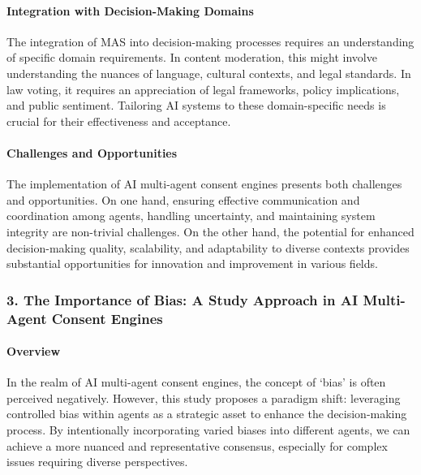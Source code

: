 \hypertarget{integration-with-decision-making-domains}{%
\paragraph{Integration with Decision-Making
Domains}\label{integration-with-decision-making-domains}}

The integration of MAS into decision-making processes requires an
understanding of specific domain requirements. In content moderation,
this might involve understanding the nuances of language, cultural
contexts, and legal standards. In law voting, it requires an
appreciation of legal frameworks, policy implications, and public
sentiment. Tailoring AI systems to these domain-specific needs is
crucial for their effectiveness and acceptance.

\hypertarget{challenges-and-opportunities}{%
\paragraph{Challenges and
Opportunities}\label{challenges-and-opportunities}}

The implementation of AI multi-agent consent engines presents both
challenges and opportunities. On one hand, ensuring effective
communication and coordination among agents, handling uncertainty, and
maintaining system integrity are non-trivial challenges. On the other
hand, the potential for enhanced decision-making quality, scalability,
and adaptability to diverse contexts provides substantial opportunities
for innovation and improvement in various fields.

\hypertarget{the-importance-of-bias-a-study-approach-in-ai-multi-agent-consent-engines}{%
\subsubsection{3. The Importance of Bias: A Study Approach in AI
Multi-Agent Consent
Engines}\label{the-importance-of-bias-a-study-approach-in-ai-multi-agent-consent-engines}}

\hypertarget{overview}{%
\paragraph{Overview}\label{overview}}

In the realm of AI multi-agent consent engines, the concept of `bias' is
often perceived negatively. However, this study proposes a paradigm
shift: leveraging controlled bias within agents as a strategic asset to
enhance the decision-making process. By intentionally incorporating
varied biases into different agents, we can achieve a more nuanced and
representative consensus, especially for complex issues requiring
diverse perspectives.

